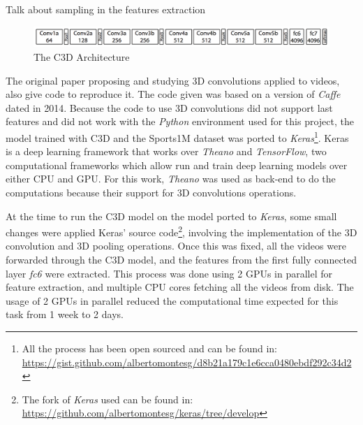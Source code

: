 Talk about sampling in the features extraction

\begin{figure}[H]
\begin{center}
\includegraphics[width=1\linewidth]{img/methodology/c3d_architecture}
\end{center}
\caption{The C3D Architecture}
\label{fig:c3d_architecture}
\end{figure}

The original paper proposing and studying 3D convolutions applied to videos, also give code to reproduce it. The code given was based on a version of \textit{Caffe}\cite{jia2014caffe} dated in 2014. Because the code to use 3D convolutions did not support last features and did not work with the \textit{Python} environment used for this project, the model trained with C3D and the Sports1M\cite{KarpathyCVPR14} dataset was ported to \textit{Keras}\footnote{All the process has been open sourced and can be found in: \url{https://gist.github.com/albertomontesg/d8b21a179c1e6cca0480ebdf292c34d2}}. Keras is a deep learning framework that works over \textit{Theano}\cite{theano2016theano} and \textit{TensorFlow}\cite{abadi2016tensorflow}, two computational frameworks which allow run and train deep learning models over either CPU and GPU. For this work, \textit{Theano} was used as back-end to do the computations because their support for 3D convolutions operations.


At the time to run the C3D model on the model ported to \textit{Keras}, some small changes were applied Keras' source code\footnote{The fork of \textit{Keras} used can be found in: \url{https://github.com/albertomontesg/keras/tree/develop}}, involving the implementation of the 3D convolution and 3D pooling operations. Once this was fixed, all the videos were forwarded through the C3D model, and the features from the first fully connected layer \textit{fc6} were extracted. This process was done using 2 GPUs in parallel for feature extraction, and multiple CPU cores fetching all the videos from disk.  The usage of 2 GPUs in parallel reduced the computational time expected for this task from 1 week to 2 days.

